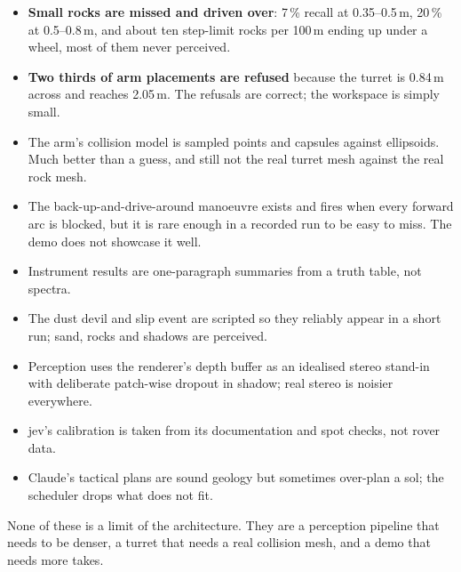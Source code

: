 \documentclass[11pt]{article}
\begin{document}
\begin{itemize}
\item \textbf{Small rocks are missed and driven over}: 7\,\% recall at 0.35--0.5\,m, 20\,\% at 0.5--0.8\,m, and about ten step-limit rocks per 100\,m ending up under a wheel, most of them never perceived.
\item \textbf{Two thirds of arm placements are refused} because the turret is 0.84\,m across and reaches 2.05\,m. The refusals are correct; the workspace is simply small.
\item The arm's collision model is sampled points and capsules against ellipsoids. Much better than a guess, and still not the real turret mesh against the real rock mesh.
\item The back-up-and-drive-around manoeuvre exists and fires when every forward arc is blocked, but it is rare enough in a recorded run to be easy to miss. The demo does not showcase it well.
\item Instrument results are one-paragraph summaries from a truth table, not spectra.
\item The dust devil and slip event are scripted so they reliably appear in a short run; sand, rocks and shadows are perceived.
\item Perception uses the renderer's depth buffer as an idealised stereo stand-in with deliberate patch-wise dropout in shadow; real stereo is noisier everywhere.
\item jev's calibration is taken from its documentation and spot checks, not rover data.
\item Claude's tactical plans are sound geology but sometimes over-plan a sol; the scheduler drops what does not fit.
\end{itemize}

None of these is a limit of the architecture. They are a perception pipeline that needs to be denser, a turret that needs a real collision mesh, and a demo that needs more takes.
\end{document}

